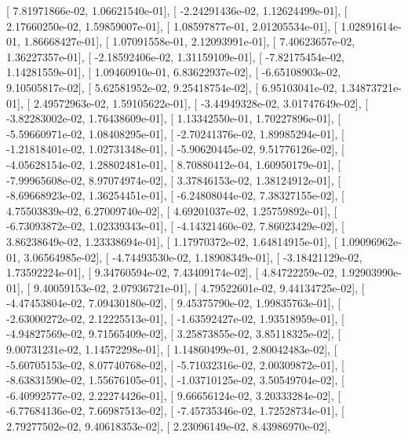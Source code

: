 \documentclass{article}
\begin{document}
       [  7.81971866e-02,   1.06621540e-01],
       [ -2.24291436e-02,   1.12624499e-01],
       [  2.17660250e-02,   1.59859007e-01],
       [  1.08597877e-01,   2.01205534e-01],
       [  1.02891614e-01,   1.86668427e-01],
       [  1.07091558e-01,   2.12093991e-01],
       [  7.40623657e-02,   1.36227357e-01],
       [ -2.18592406e-02,   1.31159109e-01],
       [ -7.82175454e-02,   1.14281559e-01],
       [  1.09460910e-01,   6.83622937e-02],
       [ -6.65108903e-02,   9.10505817e-02],
       [  5.62581952e-02,   9.25418754e-02],
       [  6.95103041e-02,   1.34873721e-01],
       [  2.49572963e-02,   1.59105622e-01],
       [ -3.44949328e-02,   3.01747649e-02],
       [ -3.82283002e-02,   1.76438609e-01],
       [  1.13342550e-01,   1.70227896e-01],
       [ -5.59660971e-02,   1.08408295e-01],
       [ -2.70241376e-02,   1.89985294e-01],
       [ -1.21818401e-02,   1.02731348e-01],
       [ -5.90620445e-02,   9.51776126e-02],
       [ -4.05628154e-02,   1.28802481e-01],
       [  8.70880412e-04,   1.60950179e-01],
       [ -7.99965608e-02,   8.97074974e-02],
       [  3.37846153e-02,   1.38124912e-01],
       [ -8.69668923e-02,   1.36254451e-01],
       [ -6.24808044e-02,   7.38327155e-02],
       [  4.75503839e-02,   6.27009740e-02],
       [  4.69201037e-02,   1.25759892e-01],
       [ -6.73093872e-02,   1.02339343e-01],
       [ -4.14321460e-02,   7.86023429e-02],
       [  3.86238649e-02,   1.23338694e-01],
       [  1.17970372e-02,   1.64814915e-01],
       [  1.09096962e-01,   3.06564985e-02],
       [ -4.74493530e-02,   1.18908349e-01],
       [ -3.18421129e-02,   1.73592224e-01],
       [  9.34760594e-02,   7.43409174e-02],
       [  4.84722259e-02,   1.92903990e-01],
       [  9.40059153e-02,   2.07936721e-01],
       [  4.79522601e-02,   9.44134725e-02],
       [ -4.47453804e-02,   7.09430180e-02],
       [  9.45375790e-02,   1.99835763e-01],
       [ -2.63000272e-02,   2.12225513e-01],
       [ -1.63592427e-02,   1.93518959e-01],
       [ -4.94827569e-02,   9.71565409e-02],
       [  3.25873855e-02,   3.85118325e-02],
       [  9.00731231e-02,   1.14572298e-01],
       [  1.14860499e-01,   2.80042483e-02],
       [ -5.60705153e-02,   8.07740768e-02],
       [ -5.71032316e-02,   2.00309872e-01],
       [ -8.63831590e-02,   1.55676105e-01],
       [ -1.03710125e-02,   3.50549704e-02],
       [ -6.40992577e-02,   2.22274426e-01],
       [  9.66656124e-02,   3.20333284e-02],
       [ -6.77684136e-02,   7.66987513e-02],
       [ -7.45735346e-02,   1.72528734e-01],
       [  2.79277502e-02,   9.40618353e-02],
       [  2.23096149e-02,   8.43986970e-02],
\end{document}
